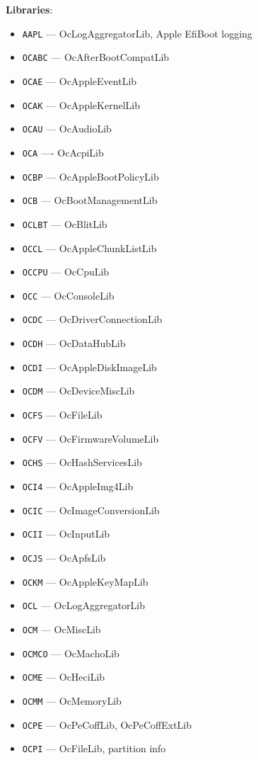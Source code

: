 \documentclass[]{article}
\providecommand{\tightlist}{%
  \setlength{\itemsep}{0pt}\setlength{\parskip}{0pt}}
\begin{document}
\begin{enumerate}
  \label{oc-mod-libs}
  \textbf{Libraries}:
  \begin{itemize}
  \tightlist
  \item \texttt{AAPL} --- OcLogAggregatorLib, Apple EfiBoot logging
  \item \texttt{OCABC} --- OcAfterBootCompatLib
  \item \texttt{OCAE} --- OcAppleEventLib
  \item \texttt{OCAK} --- OcAppleKernelLib
  \item \texttt{OCAU} --- OcAudioLib
  \item \texttt{OCA} ---- OcAcpiLib
  \item \texttt{OCBP} --- OcAppleBootPolicyLib
  \item \texttt{OCB} --- OcBootManagementLib
  \item \texttt{OCLBT} --- OcBlitLib
  \item \texttt{OCCL} --- OcAppleChunkListLib
  \item \texttt{OCCPU} --- OcCpuLib
  \item \texttt{OCC} --- OcConsoleLib
  \item \texttt{OCDC} --- OcDriverConnectionLib
  \item \texttt{OCDH} --- OcDataHubLib
  \item \texttt{OCDI} --- OcAppleDiskImageLib
  \item \texttt{OCDM} --- OcDeviceMiscLib
  \item \texttt{OCFS} --- OcFileLib
  \item \texttt{OCFV} --- OcFirmwareVolumeLib
  \item \texttt{OCHS} --- OcHashServicesLib
  \item \texttt{OCI4} --- OcAppleImg4Lib
  \item \texttt{OCIC} --- OcImageConversionLib
  \item \texttt{OCII} --- OcInputLib
  \item \texttt{OCJS} --- OcApfsLib
  \item \texttt{OCKM} --- OcAppleKeyMapLib
  \item \texttt{OCL} --- OcLogAggregatorLib
  \item \texttt{OCM} --- OcMiscLib
  \item \texttt{OCMCO} --- OcMachoLib
  \item \texttt{OCME} --- OcHeciLib
  \item \texttt{OCMM} --- OcMemoryLib
  \item \texttt{OCPE} --- OcPeCoffLib, OcPeCoffExtLib
  \item \texttt{OCPI} --- OcFileLib, partition info

\end{itemize}
\end{enumerate}
\end{document}
